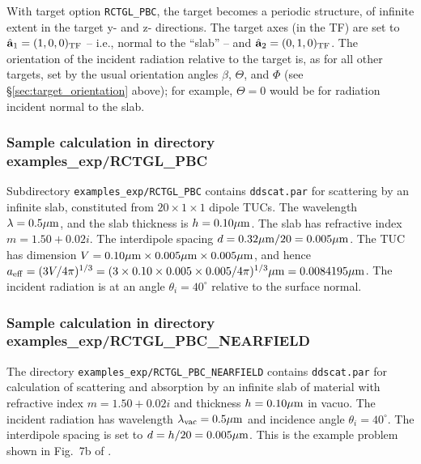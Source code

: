 	With target option {\tt RCTGL\_PBC}, the target
	becomes a periodic structure, of infinite extent in the target
	y- and z- directions.
	The target axes (in the TF) 
	are set to ${\hat{\bf a}}_1 = (1,0,0)_{\rm TF}$ --
	i.e., normal to the ``slab'' -- and
	${\hat{\bf a}}_2 = (0,1,0)_{\rm TF}$.
	The orientation of the incident radiation relative to the target
	is, as for all other targets, set by the usual orientation
	angles $\beta$, $\Theta$, and $\Phi$ 
	(see \S\ref{sec:target_orientation} above); for example,
	$\Theta=0$ would be for radiation incident normal to the slab.


\subsubsection{\bf Sample calculation in directory examples\_exp/RCTGL\_PBC}

Subdirectory {\tt examples\_exp/RCTGL\_PBC} contains {\tt ddscat.par}
for scattering by an infinite slab, constituted from $20\times1\times1$
dipole TUCs.
The wavelength $\lambda=0.5{\mu{\rm m}}$, and the slab thickness is $h=0.10{\mu{\rm m}}$.
The slab has refractive index $m=1.50+0.02i$.
The interdipole spacing $d=0.32{\mu{\rm m}}/20=0.005{\mu{\rm m}}$.
The TUC has dimension $V=0.10{\mu{\rm m}}\times0.005{\mu{\rm m}}\times0.005{\mu{\rm m}}$,
and hence 
${a}_{\rm eff}=(3V/4\pi)^{1/3}=(3\times0.10\times0.005\times0.005/4\pi)^{1/3}{\mu{\rm m}} =
0.0084195{\mu{\rm m}}$.
The incident radiation is at an angle $\theta_i=40^\circ$ relative
to the surface normal.

\subsubsection{\bf Sample calculation in directory 
               examples\_exp/RCTGL\_PBC\_NEARFIELD}

The directory {\tt examples\_exp/RCTGL\_PBC\_NEARFIELD} contains
{\tt ddscat.par} for calculation of scattering and absorption by
an infinite slab of material with refractive index $m=1.50+0.02i$ and
thickness $h=0.10{\mu{\rm m}}$ in
vacuo.  The incident radiation has wavelength $\lambda_{\rm vac}=0.5{\mu{\rm m}}$
and incidence angle $\theta_i=40^\circ$.
The interdipole spacing is set to $d=h/20 = 0.005{\mu{\rm m}}$.
This is the example problem shown in Fig.\ 7b of \citet{Draine+Flatau_2008a}.

